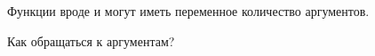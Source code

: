 
Функции вроде \printf и \scanf могут иметь переменное количество аргументов.

Как обращаться к аргументам?



